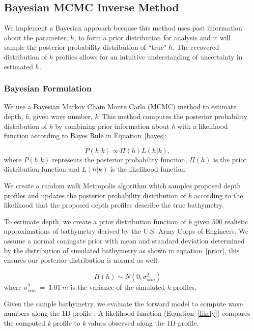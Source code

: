 \subsection{Bayesian MCMC Inverse Method}
We implement a Bayesian approach because this method uses past information about the parameter, $h$, to form a prior distribution for analysis and it will sample the posterior probability distribution of ``true" $h$. The recovered distribution of $h$ profiles allows for an intuitive understanding of uncertainty in estimated $h$.

\subsubsection{Bayesian Formulation}

We use a Bayesian Markov Chain Monte Carlo (MCMC) method to estimate depth, \textit{h}, given wave number, \textit{k}. %
This method computes the posterior probability distribution of \textit{h} by combining prior information about \textit{h} with a likelihood function according to Bayes Rule in Equation~\ref{bayes}: 


\begin{equation}\label{bayes}
P(h|%
k) \propto \Pi(h)L(h|%
k),
\end{equation} 
where $P(h|%
k)$ represents the posterior probability function, $\Pi(h)$ is the prior distribution function and $L(h|%
k)$ is the likelihood function.

We create a random walk Metropolis algorithm \citep{Metropolis1953} which samples proposed depth profiles and updates the posterior probability distribution of \textit{h} according to the likelihood that the proposed depth profiles describe the true bathymetry. 

To estimate depth, we create a prior distribution function of \textit{h} given 500 realistic approximations of bathymetry derived by the U.S. Army Corps of Engineers.  We assume a normal conjugate prior with mean and standard deviation determined by the distribution of simulated bathymetry as shown in equation~\ref{prior}, this ensures our posterior distribution is normal as well. 

\begin{equation}\label{prior}
\Pi(h) \sim N(0,\sigma_{sim}^2)
\end{equation}
where $\sigma_{sim}^2~=~1.01~m$ is the variance of the simulated \textit{h} profiles. 

Given the sample bathymetry, we evaluate the forward model to compute wave numbers along the 1D profile%
. A likelihood function (Equation~\ref{likely}) compares the computed \textit{k} profile to \textit{k} values observed along the 1D profile. 

